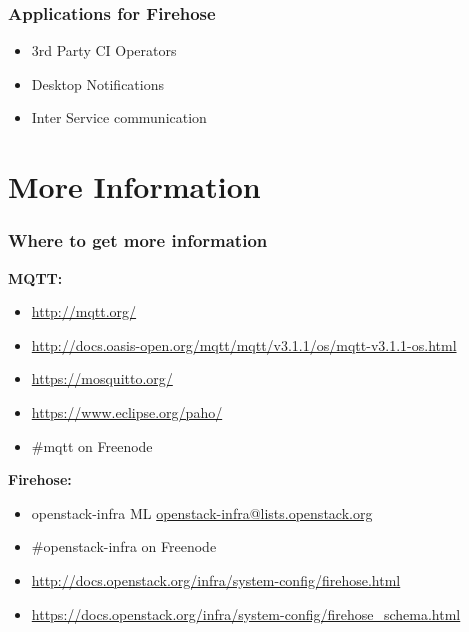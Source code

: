 \documentclass[aspectratio=169,11pt,hyperref={colorlinks=true}]{beamer}
\begin{document}
\begin{frame}
    \frametitle{Applications for Firehose}
    \begin{itemize}
        \item 3rd Party CI Operators
        \item Desktop Notifications
        \item Inter Service communication
    \end{itemize}
\end{frame}

\section{More Information}
\begin{frame}
\frametitle{Where to get more information}
    \textbf{MQTT:}
    \begin{itemize}
	    \item \href{http://mqtt.org/}{http://mqtt.org/}
        \item \href{http://docs.oasis-open.org/mqtt/mqtt/v3.1.1/os/mqtt-v3.1.1-os.html}{http://docs.oasis-open.org/mqtt/mqtt/v3.1.1/os/mqtt-v3.1.1-os.html}
	    \item \href{https://mosquitto.org/}{https://mosquitto.org/}
        \item \href{https://www.eclipse.org/paho/}{https://www.eclipse.org/paho/}
        \item \#mqtt on Freenode
    \end{itemize}
    \textbf{Firehose:}
    \begin{itemize}
        \item openstack-infra ML\: \href{mailto:openstack-infra@lists.openstack.org}{openstack-infra@lists.openstack.org}
        \item \#openstack-infra on Freenode
	    \item \href{http://docs.openstack.org/infra/system-config/firehose.html}{http://docs.openstack.org/infra/system-config/firehose.html}
        \item \href{https://docs.openstack.org/infra/system-config/firehose_schema.html}{https://docs.openstack.org/infra/system-config/firehose\_schema.html}
    \end{itemize}
\end{frame}
\end{document}
